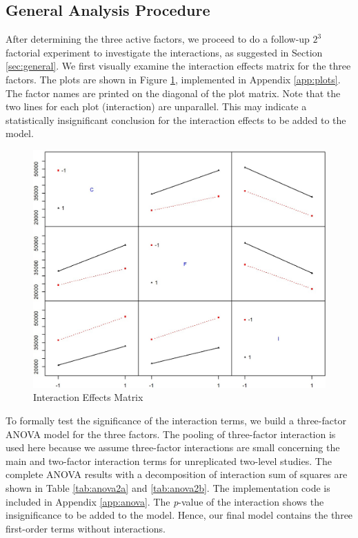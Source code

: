 \documentclass[11pt]{article}
\begin{document}
\subsection{General Analysis Procedure}
After determining the three active factors, we proceed to do a follow-up $2^3$ factorial experiment to investigate the interactions, as suggested in Section \ref{sec:general}. We first visually examine the interaction effects matrix for the three factors. The plots are shown in Figure \ref{fig:interaction}, implemented in Appendix \ref{app:plots}. The factor names are printed on the diagonal of the plot matrix. Note that the two lines for each plot (interaction) are unparallel. This may indicate a statistically insignificant conclusion for the interaction effects to be added to the model.

\begin{figure}[h!]
\centering
\includegraphics[scale = 0.6]{interaction}
\caption{Interaction Effects Matrix}\label{fig:interaction}
\end{figure}

To formally test the significance of the interaction terms, we build a three-factor ANOVA model for the three factors. The pooling of three-factor interaction is used here because we assume three-factor interactions are small concerning the main and two-factor interaction terms for unreplicated two-level studies. The complete ANOVA results with a decomposition of interaction sum of squares are shown in Table \ref{tab:anova2a} and \ref{tab:anova2b}. The implementation code is included in Appendix \ref{app:anova}. The \textit{p}-value of the interaction shows the insignificance to be added to the model. Hence, our final model contains the three first-order terms without interactions.
\end{document}
